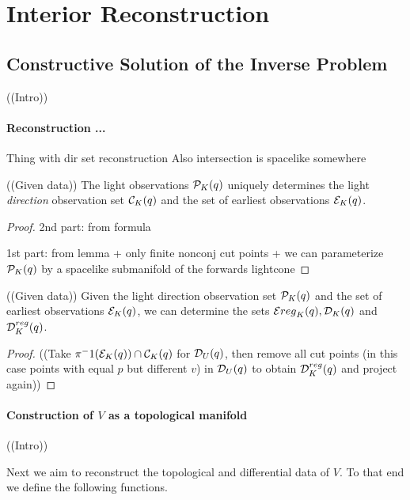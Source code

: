 \chapter{Interior Reconstruction}
\section{Constructive Solution of the Inverse Problem}
 
((Intro))

\subsubsection{Reconstruction ...}


\begin{lemma}
Thing with dir set reconstruction
Also intersection is spacelike somewhere
\end{lemma}

\begin{proposition}
((Given data))
The light observations $\mathcal{P}_K(q)$ uniquely determines the light \emph{direction} observation set $\mathcal{C}_K(q)$ and the set of earliest observations $\mathcal{E}_K(q)$.
\end{proposition}
\begin{proof}
2nd part: from formula

1st part: from lemma + only finite nonconj cut points + we can parameterize $\mathcal{P}_K(q)$ by a spacelike submanifold of the forwards lightcone
\end{proof}

\begin{proposition}
((Given data))
Given the light direction observation set $\mathcal{P}_K(q)$ and the set of earliest observations $\mathcal{E}_K(q)$, we can determine the sets $\mathcal{E}{reg}_K(q), \mathcal{D}_K(q)$ and $\mathcal{D}^{reg}_K(q)$.
\end{proposition}
\begin{proof}
((Take $\pi^-1(\mathcal{E}_K(q))\cap \mathcal{C}_K(q)$ for $\mathcal{D}_U(q)$, then remove all cut points (in this case points with equal $p$ but different $v$) in $\mathcal{D}_U(q)$ to obtain $\mathcal{D}^{reg}_K(q)$ and project again))
\end{proof}

\subsubsection{Construction of $V$ as a topological manifold}
((Intro))

Next we aim to reconstruct the topological and differential data of $V$. To that end we define the following functions.

